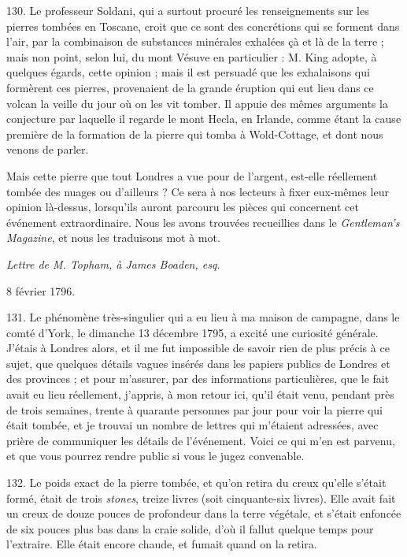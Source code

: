 \documentclass[a4paper, 11pt, oneside, polutonikogreek, french]{article}
\begin{document}
130. Le professeur Soldani, qui a surtout procuré les renseignements sur les pierres tombées en Toscane, croit que ce sont des concrétions qui se forment dans l'air, par la combinaison de substances minérales exhalées çà et là de la terre ; mais non point, selon lui, du mont Vésuve en particulier : M. King adopte, à quelques égards, cette opinion ; mais il est persuadé que les exhalaisons qui formèrent ces pierres, provenaient de la grande éruption qui eut lieu dans ce volcan la veille du jour où on les vit tomber. Il appuie des mêmes arguments la conjecture par laquelle il regarde le mont Hecla, en Irlande, comme étant la cause première de la formation de la pierre qui tomba à Wold-Cottage, et dont nous venons de parler.

Mais cette pierre que tout Londres a vue pour de l'argent, est-elle réellement tombée des nuages ou d'ailleurs ? Ce sera à nos lecteurs à fixer eux-mêmes leur opinion là-dessus, lorsqu'ils auront parcouru les pièces qui concernent cet événement extraordinaire. Nous les avons trouvées recueillies dans le \emph{Gentleman's Magazine}, et nous les traduisons mot à mot.

\emph{Lettre de M. Topham, à James Boaden, esq.}

8 février 1796.

131. Le phénomène très-singulier qui a eu lieu à ma maison de campagne, dans le comté d'York, le dimanche 13 décembre 1795, a excité une curiosité générale. J'étais à Londres alors, et il me fut impossible de savoir rien de plus précis à ce sujet, que quelques détails vagues insérés dans les papiers publics de Londres et des provinces ; et pour m'assurer, par des informations particulières, que le fait avait eu lieu réellement, j'appris, à mon retour ici, qu'il était venu, pendant près de trois semaines, trente à quarante personnes par jour pour voir la pierre qui était tombée, et je trouvai un nombre de lettres qui m'étaient adressées, avec prière de communiquer les détails de l'événement. Voici ce qui m'en est parvenu, et que vous pourrez rendre public si vous le jugez convenable.

132. Le poids exact de la pierre tombée, et qu'on retira du creux qu'elle s'était formé, était de trois \emph{stones}, treize livres (soit cinquante-six livres). Elle avait fait un creux de douze pouces de profondeur dans la terre végétale, et s'était enfoncée de six pouces plus bas dans la craie solide, d'où il fallut quelque temps pour l'extraire. Elle était encore chaude, et fumait quand on la retira.
\end{document}
